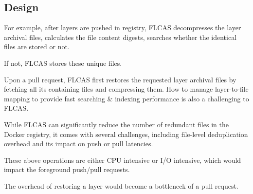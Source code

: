 \subsection{Design}
\label{sec:design}

%
%


For example, after layers are pushed in registry, FLCAS decompresses the layer archival files,
calculates the file content digests, searches whether the identical files are stored or not. 

If not, FLCAS stores these unique files.

%
Upon a pull request, FLCAS first restores the requested 
layer archival files by fetching all its containing files and compressing them.
%
How to manage layer-to-file mapping to provide fast searching \& indexing performance 
is also a challenging to FLCAS.




%



While FLCAS can significantly reduce the number of redundant files in the Docker
registry, it comes with several challenges, 
including file-level deduplication overhead and its impact on push or pull latencies.

These above operations are either CPU intensive or I/O intensive, which would impact 
the foreground push/pull requests.

The overhead of restoring a layer would become a bottleneck of a pull request.



